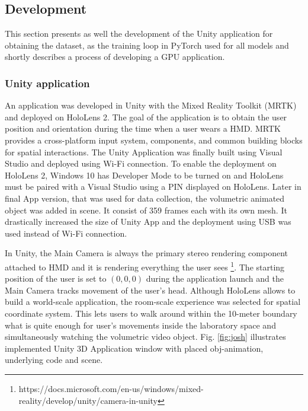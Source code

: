 
\subsection{Development}
\label{sec:impl:model:dev}
This section presents as well the development of the Unity application for obtaining the dataset, as the training loop in PyTorch used for all models and shortly describes a process of developing a GPU application. 

\subsubsection{Unity application}
\label{sec:impl:model:dev:unity}
An application was developed in Unity with the Mixed Reality Toolkit (MRTK) and deployed on HoloLens 2. The goal of the application is to obtain the user position and orientation during the time when a user wears a HMD. MRTK provides a cross-platform input system, components, and common building blocks for spatial interactions. The Unity Application was finally built using Visual Studio and deployed using Wi-Fi connection. To enable the deployment on HoloLens 2, Windows 10 has Developer Mode to be turned on and HoloLens must be paired with a Visual Studio using a PIN displayed on HoloLens. Later in final App version, that was used for data collection, the volumetric animated object was added in scene. It consist of 359 frames each with its own mesh. It drastically increased the size of Unity App and the deployment using USB was used instead of Wi-Fi connection.

In Unity, the Main Camera is always the primary stereo rendering component attached to HMD and it is rendering everything the user sees \footnote{https://docs.microsoft.com/en-us/windows/mixed-reality/develop/unity/camera-in-unity}. The starting position of the user is set to $(0, 0, 0)$ during the application launch and the Main Camera tracks movement of the user's head. Although HoloLens allows to build a world-scale application, the room-scale experience was selected for spatial coordinate system. This lets users to walk around within the 10-meter boundary what is quite enough for user's movements inside the laboratory space and simultaneously watching the volumetric video object. Fig. \ref{fig:josh} illustrates implemented Unity 3D Application window with placed obj-animation, underlying code and scene.

